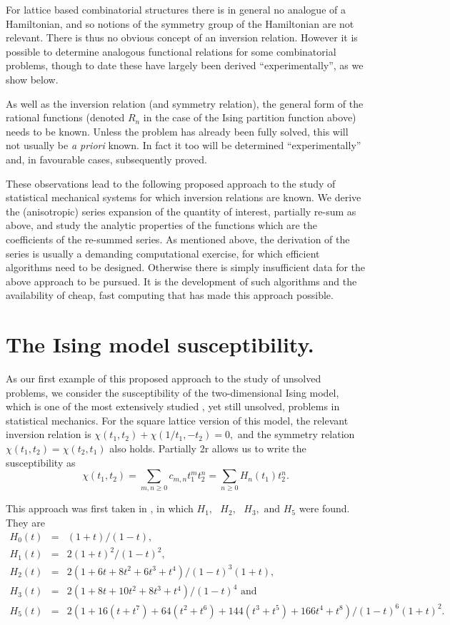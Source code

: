 For lattice based combinatorial structures there is in general no
analogue of a Hamiltonian, and so notions of the symmetry group of
the Hamiltonian are not relevant. There is thus no obvious concept
of an inversion relation. However it is possible
to determine analogous functional relations for some combinatorial problems,
though to date these have largely been derived ``experimentally'', as we show
below.

As well as the inversion relation (and symmetry relation), the general
form of the rational functions (denoted $R_n$ in the case of the Ising
partition function above) needs to be known. Unless the problem has
already been fully solved, this will not usually be {\em a priori}
known. In fact it too will be determined ``experimentally'' and, in
favourable cases, subsequently proved.

These observations lead to the following proposed approach to the
study of statistical mechanical systems for which inversion relations
are known. We derive the (anisotropic) series expansion of the
quantity of interest, partially re-sum as above,
and study the analytic properties of the functions which are the coefficients
of the re-summed series. As mentioned above, the derivation
of the series is usually a demanding computational exercise, for
which efficient algorithms need to be designed. Otherwise there
is simply insufficient data for the above approach to be pursued.
It is the development of such algorithms and the availability of cheap,
fast computing that has made this approach possible.

\section{The Ising model susceptibility.}
As our first example of this proposed approach to the study
of unsolved problems, we consider the susceptibility of the two-dimensional
Ising model, which is one of the most extensively studied \cite{Cit72}, 
 yet still
unsolved, problems in statistical mechanics. For the square lattice
version of this model, the relevant inversion relation \cite{Jaek85b}
is $\chi(t_1,t_2) + \chi(1/t_1,-t_2) = 0,$ and the symmetry relation
$ \chi(t_1,t_2) = \chi(t_2,t_1)$ also holds. Partially 2r allows us to
write the susceptibility as
$$\chi(t_1,t_2) = \sum_{m,n\ge 0} c_{m,n}t_1^mt_2^n = \sum_{n\ge 0}
H_n(t_1)t_2^n. $$ 

This approach was first taken in \cite{Hans87}, in
which $H_1, \mbox{  }H_2, \mbox{  }H_3, \mbox{ and }H_5 $ were
found.
They are
\begin{eqnarray*}
H_0(t)& =& (1 + t)/(1 - t), \\
H_1(t)& =& 2(1 + t)^2/(1 - t)^2,\\ 
H_2(t)& =& 2(1 + 6t + 8t^2 + 6t^3 + t^4)/(1 - t)^3(1+t),\\
H_3(t)& =& 2(1 + 8t + 10t^2 + 8t^3 + t^4)/(1 - t)^4 \mbox{ and}\\
H_5(t)& =& 2(1 + 16(t+t^7) + 64(t^2+t^6) + 144(t^3+t^5) + 166t^4+ t^8)/(1 - t)^6(1+t)^2.
\end{eqnarray*}

